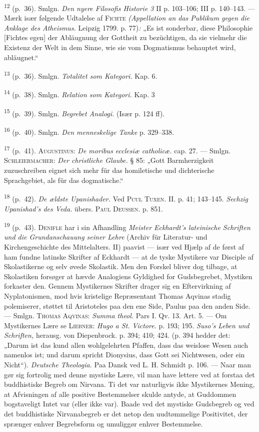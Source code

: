 \documentclass[12pt,a4paper,openany]{book}
\newcommand{\opage}[1]{\marginnote{\footnotesize\textit{[#1]}}}
\begin{document}
\begin{small}
\opage{247}\textsuperscript{12} (p.~36). Smlgn. \textit{Den nyere
Filosofis Historie 3} II p. 103--106; III p.
140--143. --- Mærk især følgende Udtalelse af \textsc{Fichte}
\textit{(Appellation an das Publikum gegen die Anklage des Atheismus.}
Leipzig 1799. p. 77)\textit{:} „Es ist sonderbar, diese Philosophie
[Fichtes egen] der Abläugnung der Gottheit zu bezüchtigen, da sie
vielmehr die Existenz der Welt in dem Sinne, wie sie vom Dogmatismus
behauptet wird, abläugnet.“

\textsuperscript{13} (p.~36). Smlgn. \textit{Totalitet som Kategori.}
Kap. 6.

\textsuperscript{14} (p.~38). Smlgn. \textit{Relation som Kategori.}
Kap. 3

\textsuperscript{15} (p.~39). Smlgn. \textit{Begrebet Analogi.} (Især p.
124 ff).

\textsuperscript{16} (p.~40). Smlgn. \textit{Den menneskelige Tanke} p.
329--338.

\textsuperscript{17} (p.~41). \textsc{Augustinus}: \textit{De moribus
ecclesiæ catholicæ.} cap. 27.
--- Smlgn. \textsc{Schleiermacher}: \textit{Der christliche Glaube.} §
85: „Gott Barmherzigkeit zuzuschreiben eignet sich mehr für das
homiletische und dichterische Sprachgebiet, als für das dogmatische.“

\textsuperscript{18} (p.~42). \textit{De ældste Upanishader.} Ved
\textsc{Pcul Tuxen}. II. p. 41;
143--145. \textit{Sechzig Upanishad’s des Veda.} übers. \textsc{Paul
Deussen}. p. 851.

\textsuperscript{19} (p.~43). \textsc{Denifle} har i sin Afhandling
\textit{Meister Eckhardt’s
lateinische Schriften und die Grundanschauung seiner Lehre} (Archiv für
Literatur- und Kirchengeschichte des Mittelalters. II) paavist --- især
ved Hjælp af de først af ham fundne latinske Skrifter af Eckhardt --- at
de tyske Mystikere var Disciple af Skolastikerne og selv øvede
Skolastik. Men den Forskel bliver dog tilbage, at Skolastiken forsøger
at hævde Analogiens Gyldighed for Gudsbegrebet, Mystiken forkaster den.
Gennem Mystikernes Skrifter drager sig en Eftervirkning af
Nyplatonismen, mod hvis kristelige Repræsentant Thomas Aqvinas stadig
polemiserer, støttet til Aristoteles paa den ene Side, Paulus paa den
anden Side. --- Smlgn. \textsc{Thomas Aqvinas}: \textit{Summa theol.}
Pars I. Qv. 13. Art. 5. --- Om Mystikernes Lære se \textsc{Liebner}:
\textit{Hugo a St. Victore.} p. 193; 195. \textit{Suso’s Leben und
Schriften,} herausg. von Diepenbrock. p. 394; 410; 424. (p. 394 hedder
det: „Darum ist das kund allen wohlgelehrten Pfaffen, dass das weislose
Wesen auch namenlos ist; und darum spricht Dionysius, dass Gott sei
Nichtwesen, oder ein Nicht“). \textit{Deutsche Theologia.} Paa Dansk ved
L. H. Schmidt p. 106. --- Naar man gør sig fortrolig med denne mystiske
Lære, vil man have lettere ved at forstaa det buddhistiske Begreb om
Nirvana. Ti det var naturligvis ikke Mystikernes Mening, at Afvisningen
af alle positive Bestemmelser skulde antyde, at Guddommen bogstaveligt
Intet var (eller ikke var). Baade ved det mystiske Gudsbegreb og ved det
buddhistiske Nirvanabegreb er det netop den uudtømmelige Positivitet,
der sprænger enhver Begrebsform og umuliggør enhver Bestemmelse.


\end{small}
\end{document}
